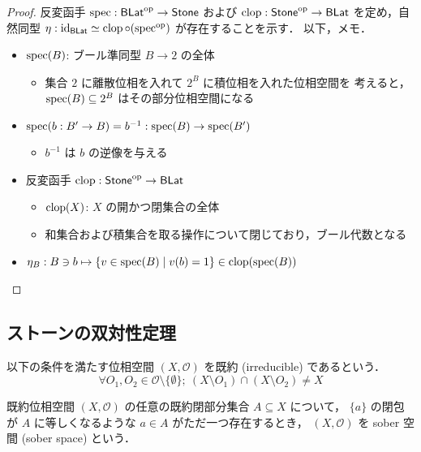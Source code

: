 \documentclass[titlepage]{ltjsreport}
\newtheorem[S]{theorem}{定理}[chapter]
\newtheorem[S]{definition}[theorem]{定義}
\newtheorem[S]{example}[theorem]{例}
\begin{document}
\begin{proof}
  反変函手 $\operatorname{spec}:\mathsf{BLat}^\mathrm{op}\to\mathsf{Stone}$ および
  $\operatorname{clop}:\mathsf{Stone}^\mathrm{op}\to\mathsf{BLat}$ を定め，自然同型
  $\eta:\mathrm{id}_{\mathsf{BLat}}\simeq\operatorname{clop}\circ(\operatorname{spec}^\mathrm{op})$ が存在することを示す．
  以下，メモ．
  \begin{itemize}
    \item $\operatorname{spec}(B)$: ブール準同型 $B\to2$ の全体
          \begin{itemize}
            \item 集合 $2$ に離散位相を入れて $2^B$ に積位相を入れた位相空間を
                  考えると，$\operatorname{spec}(B)\subseteq 2^B$ はその部分位相空間になる
          \end{itemize}
    \item $\operatorname{spec}(b:B'\to B)=b^{-1}:\operatorname{spec}(B)\to\operatorname{spec}(B')$
          \begin{itemize}
            \item $b^{-1}$ は $b$ の逆像を与える
          \end{itemize}
    \item 反変函手 $\operatorname{clop}:\mathsf{Stone}^\mathrm{op}\to\mathsf{BLat}$
          \begin{itemize}
            \item $\operatorname{clop}(X)$: $X$ の開かつ閉集合の全体
            \item 和集合および積集合を取る操作について閉じており，ブール代数となる
          \end{itemize}
    \item $\eta_B:B\ni b\mapsto\{v\in\operatorname{spec}(B)\mid v(b)=1\}\in\operatorname{clop}(\operatorname{spec}(B))$
  \end{itemize}
\end{proof}

\subsection{ストーンの双対性定理}

\begin{definition}[既約]
  以下の条件を満たす位相空間
  $(X,\mathcal{O})$
  を既約
  (irreducible)
  であるという．
  \begin{equation}
    \forall O_1,O_2\in\mathcal{O}\setminus\{\emptyset\};
    \ (X\setminus O_1)\cap(X\setminus O_2)\neq X
  \end{equation}
\end{definition}

\begin{definition}[sober 空間]
  既約位相空間
  $(X,\mathcal{O})$
  の任意の既約閉部分集合
  $A\subseteq X$
  について，
  $\{a\}$
  の閉包が
  $A$
  に等しくなるような
  $a\in A$
  がただ一つ存在するとき，
  $(X,\mathcal{O})$
  を sober 空間 (sober space) という．
\end{definition}
\end{document}
